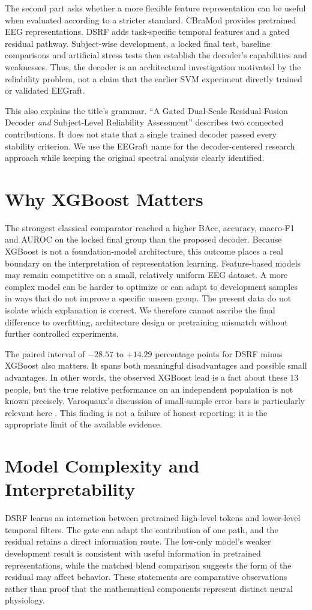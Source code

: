 The second part asks whether a more flexible feature representation can be useful when evaluated according to a stricter standard. CBraMod provides pretrained EEG representations. DSRF adds task-specific temporal features and a gated residual pathway. Subject-wise development, a locked final test, baseline comparisons and artificial stress tests then establish the decoder's capabilities and weaknesses. Thus, the decoder is an architectural investigation motivated by the reliability problem, not a claim that the earlier SVM experiment directly trained or validated EEGraft.

This also explains the title's grammar. ``A Gated Dual-Scale Residual Fusion Decoder \emph{and} Subject-Level Reliability Assessment'' describes two connected contributions. It does not state that a single trained decoder passed every stability criterion. We use the EEGraft name for the decoder-centered research approach while keeping the original spectral analysis clearly identified.

\section{Why XGBoost Matters}
The strongest classical comparator reached a higher BAcc, accuracy, macro-F1 and AUROC on the locked final group than the proposed decoder. Because XGBoost is not a foundation-model architecture, this outcome places a real boundary on the interpretation of representation learning. Feature-based models may remain competitive on a small, relatively uniform EEG dataset. A more complex model can be harder to optimize or can adapt to development samples in ways that do not improve a specific unseen group. The present data do not isolate which explanation is correct. We therefore cannot ascribe the final difference to overfitting, architecture design or pretraining mismatch without further controlled experiments.

The paired interval of $-28.57$ to $+14.29$ percentage points for DSRF minus XGBoost also matters. It spans both meaningful disadvantages and possible small advantages. In other words, the observed XGBoost lead is a fact about these 13 people, but the true relative performance on an independent population is not known precisely. Varoquaux's discussion of small-sample error bars is particularly relevant here \cite{varoquaux2018}. This finding is not a failure of honest reporting; it is the appropriate limit of the available evidence.

\section{Model Complexity and Interpretability}
DSRF learns an interaction between pretrained high-level tokens and lower-level temporal filters. The gate can adapt the contribution of one path, and the residual retains a direct information route. The low-only model's weaker development result is consistent with useful information in pretrained representations, while the matched blend comparison suggests the form of the residual may affect behavior. These statements are comparative observations rather than proof that the mathematical components represent distinct neural physiology.

